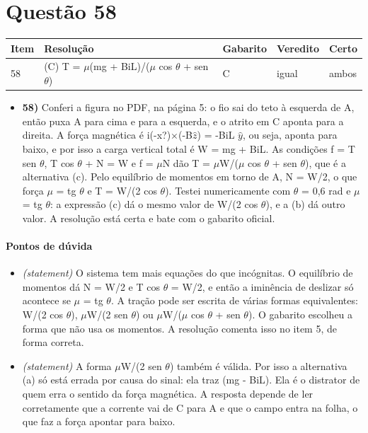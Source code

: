 \documentclass{article}%
\begin{document}
\section*{Questão 58}%
\begin{longtable}{@{}p{} p{} p{} p{} p{}@{}}\toprule Item & Resolução & Gabarito & Veredito & Certo \\ \midrule
58 & (C) T = $\mu$(mg + BiL)/($\mu$ cos $\theta$ + sen $\theta$) & C & igual & ambos \\
\bottomrule\end{longtable}%
\begin{itemize}%
\item%
\textbf{58)} Conferi a figura no PDF, na página 5: o fio sai do teto à esquerda de A, então puxa A para cima e para a esquerda, e o atrito em C aponta para a direita. A força magnética é i(-x?)$\times$(-B$\hat z$) = -BiL $\hat y$, ou seja, aponta para baixo, e por isso a carga vertical total é W = mg + BiL. As condições f = T sen $\theta$, T cos $\theta$ + N = W e f = $\mu$N dão T = $\mu$W/($\mu$ cos $\theta$ + sen $\theta$), que é a alternativa (c). Pelo equilíbrio de momentos em torno de A, N = W/2, o que força $\mu$ = tg $\theta$ e T = W/(2 cos $\theta$). Testei numericamente com $\theta$ = 0,6 rad e $\mu$ = tg $\theta$: a expressão (c) dá o mesmo valor de W/(2 cos $\theta$), e a (b) dá outro valor. A resolução está certa e bate com o gabarito oficial.%
\end{itemize}%
\paragraph{Pontos de dúvida}%
\begin{itemize}%
\item%
\textit{(statement)} O sistema tem mais equações do que incógnitas. O equilíbrio de momentos dá N = W/2 e T cos $\theta$ = W/2, e então a iminência de deslizar só acontece se $\mu$ = tg $\theta$. A tração pode ser escrita de várias formas equivalentes: W/(2 cos $\theta$), $\mu$W/(2 sen $\theta$) ou $\mu$W/($\mu$ cos $\theta$ + sen $\theta$). O gabarito escolheu a forma que não usa os momentos. A resolução comenta isso no item 5, de forma correta.%
\item%
\textit{(statement)} A forma $\mu$W/(2 sen $\theta$) também é válida. Por isso a alternativa (a) só está errada por causa do sinal: ela traz (mg - BiL). Ela é o distrator de quem erra o sentido da força magnética. A resposta depende de ler corretamente que a corrente vai de C para A e que o campo entra na folha, o que faz a força apontar para baixo.%
\end{itemize}%
\end{document}

